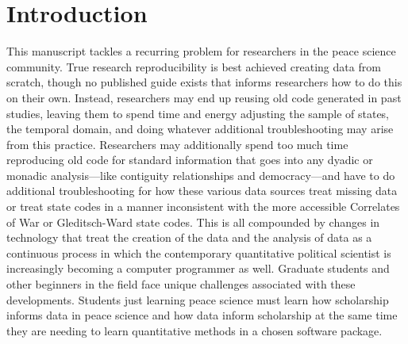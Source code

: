 \documentclass[
  11pt,
]{article}
\begin{document}
\vskip -8.5pt




\setlength{\parindent}{16pt}
\setlength{\parskip}{0pt}

\hypertarget{introduction}{%
\section{Introduction}\label{introduction}}

This manuscript tackles a recurring problem for researchers in the peace science community. True research reproducibility is best achieved creating data from scratch, though no published guide exists that informs researchers how to do this on their own. Instead, researchers may end up reusing old code generated in past studies, leaving them to spend time and energy adjusting the sample of states, the temporal domain, and doing whatever additional troubleshooting may arise from this practice. Researchers may additionally spend too much time reproducing old code for standard information that goes into any dyadic or monadic analysis---like contiguity relationships and democracy---and have to do additional troubleshooting for how these various data sources treat missing data or treat state codes in a manner inconsistent with the more accessible Correlates of War or Gleditsch-Ward state codes. This is all compounded by changes in technology that treat the creation of the data and the analysis of data as a continuous process in which the contemporary quantitative political scientist is increasingly becoming a computer programmer as well. Graduate students and other beginners in the field face unique challenges associated with these developments. Students just learning peace science must learn how scholarship informs data in peace science and how data inform scholarship at the same time they are needing to learn quantitative methods in a chosen software package.
\end{document}
